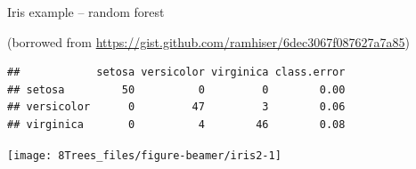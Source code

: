\documentclass[10pt,ignorenonframetext,]{beamer}
\newenvironment{Shaded}{\begin{snugshade}}{\end{snugshade}}
\newcommand{\KeywordTok}[1]{\textcolor[rgb]{0.13,0.29,0.53}{\textbf{#1}}}
\newcommand{\DataTypeTok}[1]{\textcolor[rgb]{0.13,0.29,0.53}{#1}}
\newcommand{\DecValTok}[1]{\textcolor[rgb]{0.00,0.00,0.81}{#1}}
\newcommand{\StringTok}[1]{\textcolor[rgb]{0.31,0.60,0.02}{#1}}
\newcommand{\OperatorTok}[1]{\textcolor[rgb]{0.81,0.36,0.00}{\textbf{#1}}}
\newcommand{\NormalTok}[1]{#1}
\begin{document}
\begin{frame}[fragile]

\begin{block}{Iris example -- random forest}

\tiny
(borrowed from
\url{https://gist.github.com/ramhiser/6dec3067f087627a7a85})

\vspace{3mm}

\scriptsize

\begin{Shaded}
\end{Shaded}

\begin{verbatim}
##            setosa versicolor virginica class.error
## setosa         50          0         0        0.00
## versicolor      0         47         3        0.06
## virginica       0          4        46        0.08
\end{verbatim}

\vspace{3mm}

\begin{center}\texttt{[image: 8Trees\_files/figure-beamer/iris2-1]} \end{center}

\end{block}

\end{frame}
\end{document}
